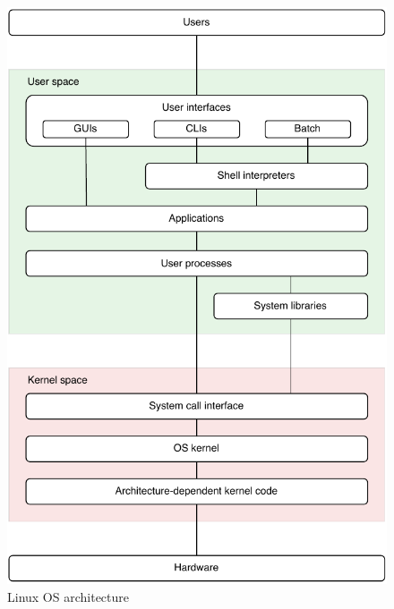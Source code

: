 \begin{figure}[htbp]
    \vspace{10pt}
    \centering
    \includegraphics{assets/linux_os_structure.pdf}
    \caption{Linux OS architecture}
    \label{fig:linux_os_structure}
    \vspace{10pt}
\end{figure}

